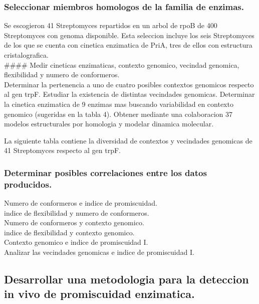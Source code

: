 \documentclass[12pt,twoside]{reedthesis}
\begin{document}
  \subsubsection{Seleccionar miembros homologos de la familia de
  enzimas.}\label{seleccionar-miembros-homologos-de-la-familia-de-enzimas.}
  
  Se escogieron 41 Streptomyces repartidos en un arbol de rpoB de 400
  Streptomyces con genoma disponible. Esta seleccion incluye los seis
  Streptomyces de los que se cuenta con cinetica enzimatica de PriA, tres
  de ellos con estructura cristalografica.\\
  \#\#\#\# Medir cineticas enzimaticas, contexto genomico, vecindad
  genomica, flexibilidad y numero de conformeros.\\
  Determinar la pertenencia a uno de cuatro posibles contextos genomicos
  respecto al gen trpF. Estudiar la existencia de distintas vecindades
  genomicas. Determinar la cinetica enzimatica de 9 enzimas mas buscando
  variabilidad en contexto genomico (sugeridas en la tabla 4). Obtener
  mediante una colaboracion 37 modelos estructurales por homologia y
  modelar dinamica molecular.
  
  La siguiente tabla contiene la diversidad de contextos y vecindades
  genomicas de 41 Streptomyces respecto al gen trpF.
  
  \subsubsection{Determinar posibles correlaciones entre los datos
  producidos.}\label{determinar-posibles-correlaciones-entre-los-datos-producidos.}
  
  Numero de conformeros e indice de promiscuidad.\\
  indice de flexibilidad y numero de conformeros.\\
  Numero de conformeros y contexto genomico.\\
  indice de flexibilidad y contexto genomico.\\
  Contexto genomico e indice de promiscuidad I.\\
  Analizar las vecindades genomicas e indice de promiscuidad I.
  
  \subsection{Desarrollar una metodologia para la deteccion in vivo de
  promiscuidad
  enzimatica.}\label{desarrollar-una-metodologia-para-la-deteccion-in-vivo-de-promiscuidad-enzimatica.}
  
\end{document}
